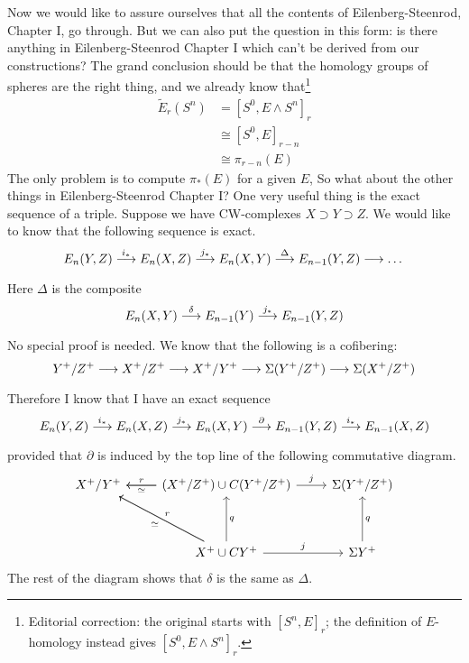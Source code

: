 \documentclass[../main]{subfiles}
\begin{document}
Now we would like to assure ourselves that all the contents of Eilenberg-Steenrod, Chapter I, go through. But we can also put the question in this form: is there anything in Eilenberg-Steenrod Chapter I which can't be derived from our constructions? The grand conclusion should be that the homology groups of spheres are the right thing, and we already know that\footnote{Editorial correction: the original starts with $[S^n,E]_r$; the definition of $E$-homology instead gives $[S^0,E\wedge S^n]_r$.}
\begin{align}
    \widetilde{E}_r( S^n) &= [S^0, E\wedge S^n]_r \nonumber \\
    &\cong [S^0, E]_{r-n} \nonumber \\
    &\cong \pi_{r-n}(E) \nonumber
\end{align}
The only problem is to compute $\pi_\ast(E)$ for a given $E$, So what about the other things in Eilenberg-Steenrod Chapter I? One very useful thing is the exact sequence of a triple. Suppose we have CW-complexes $X\supset Y\supset Z$. We would like to know that the following sequence is exact.
\[E_n(Y, Z)\vra{i_\ast} E_n(X, Z) \vra{j_\ast} E_n(X, Y) \vra{\Delta} E_{n-1}(Y, Z) \lra \dots\]
Here $\Delta$ is the composite
\[E_n(X,Y) \vra{\delta} E_{n-1}(Y)\vra{j_\ast} E_{n-1}(Y, Z)\]
No special proof is needed. We know that the following is a cofibering:
\[Y^+/Z^+ \vra{} X^+/Z^+\vra{}X^+/Y^+ \vra{} \Sigma(Y^+/Z^+) \vra{} \Sigma(X^+/Z^+)\]
Therefore I know that I have an exact sequence
\[E_n(Y,Z) \vra{i_\ast} E_n(X, Z)\vra{j_\ast}E_n(X, Y) \vra{\partial} E_{n-1}(Y, Z) \vra{i_\ast} E_{n-1}(X, Z)\]
provided that $\partial$ is induced by the top line of the following commutative diagram.
\[\begin{tikzcd}
	{X^+/Y^+} & {(X^+/Z^+)\cup C(Y^+/Z^+)} & {\Sigma(Y^+/Z^+)} \\
	\\
	& {X^+\cup CY^+} & {\Sigma Y^+}
	\arrow["j", from=1-2, to=1-3]
	\arrow["r"', from=1-2, to=1-1]
	\arrow["\simeq", from=1-2, to=1-1]
	\arrow["q"', from=3-2, to=1-2]
	\arrow["\simeq", from=3-2, to=1-1]
	\arrow["j", from=3-2, to=3-3]
	\arrow["q"', from=3-3, to=1-3]
	\arrow["r"', from=3-2, to=1-1]
\end{tikzcd}\]
The rest of the diagram shows that $\delta$ is the same as $\Delta$.
\end{document}

